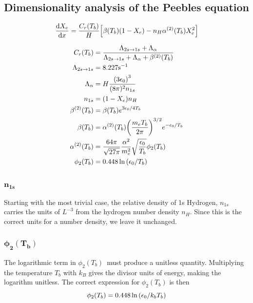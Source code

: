 \documentclass[10pt, a4paper]{article}
\begin{document}
\subsection{Dimensionality analysis of the Peebles equation}

\begin{equation}
    \dv{X_{e}}{x}=\frac{C_{r}\qty(T_{b})}{H}\qty[\beta\qty(T_{b})\qty(1-X_{e})-n_{H} \alpha^{(2)}\qty(T_{b}) X_{e}^{2}]
\end{equation}

\begin{align}
    \label{eqn:1}
    C_{r}\qty(T_{b}) &=\frac{\Lambda_{2 s \rightarrow 1 s}+\Lambda_{\alpha}}{\Lambda_{2 s \rightarrow 1 s}+\Lambda_{\alpha}+\beta^{(2)}\qty(T_{b})} \\
    \label{eqn:2}
    \Lambda_{2 s \rightarrow 1 s} &=8.227 \mathrm{s}^{-1} \\
    \label{eqn:4}
    \Lambda_{\alpha} &=H \frac{\qty(3 \epsilon_{0})^{3}}{(8 \pi)^{2} n_{1 s}} \\
    \label{eqn:5}
    n_{1 s} &=\qty(1-X_{e}) n_{H} \\
    \label{eqn:6}
    \beta^{(2)}\qty(T_{b}) &=\beta\qty(T_{b}) e^{3 \epsilon_{0} / 4 T_{b}} \\
    \label{eqn:7}
    \beta\qty(T_{b}) &=\alpha^{(2)}\qty(T_{b})\qty(\frac{m_{e} T_{b}}{2 \pi})^{3 / 2} e^{-\epsilon_{0} / T_{b}} \\
    \label{eqn:8}
    \alpha^{(2)}\qty(T_{b}) &=\frac{64 \pi}{\sqrt{27 \pi}} \frac{\alpha^{2}}{m_{e}^{2}} \sqrt{\frac{\epsilon_{0}}{T_{b}}} \phi_{2}\qty(T_{b}) \\
    \label{eqn:9}
    \phi_{2}\qty(T_{b}) &=0.448 \ln \qty(\epsilon_{0} / T_{b})
\end{align}



\subsubsection{\texorpdfstring{$\mathbf{n_{1s}}$}{TEXT} }
Starting with the most trivial case, the relative density of 1s Hydrogen, $n_{1s}$ carries the units of $L^{-3}$ from the hydrogen number density $n_H$. Since this is the correct units for a number density, we leave it unchanged.


\subsubsection{\texorpdfstring{$\mathbf{\phi_2(T_b)}$}{TEXT} }
The logarithmic term in $\phi_2(T_b)$ must produce a unitless quantity. Multiplying the temperature $T_b$ with $k_B$ gives the divisor units of energy, making the logarithm unitless. The correct expression for $\phi_2(T_b)$ is then
\begin{equation*}
    \phi_{2}\qty(T_{b}) = 0.448 \ln \qty(\epsilon_{0} / k_b T_{b})
\end{equation*}
\end{document}
